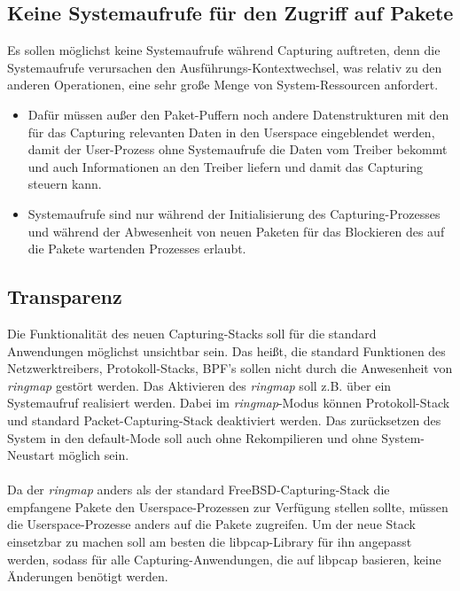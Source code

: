 \subsection{Keine Systemaufrufe für den Zugriff auf Pakete}
Es sollen möglichst keine Systemaufrufe während Capturing auftreten, denn die
Systemaufrufe verursachen den Ausführungs-Kontextwechsel, was relativ zu den
anderen Operationen, eine sehr große Menge von System-Ressourcen anfordert.
		\begin{itemize}
			\item Dafür müssen außer den Paket-Puffern noch andere
				Datenstrukturen mit den für das Capturing relevanten Daten in den
				Userspace eingeblendet werden, damit der User-Prozess ohne
				Systemaufrufe die Daten vom Treiber bekommt und auch
				Informationen an den Treiber liefern und damit das Capturing
				steuern kann.
			\item   Systemaufrufe sind nur während der Initialisierung des
				Capturing-Prozesses 
				und während der Abwesenheit von neuen
				Paketen für das Blockieren des auf die Pakete wartenden
				Prozesses erlaubt. 
		\end{itemize}

\subsection{Transparenz}
Die Funktionalität des neuen Capturing-Stacks soll für die standard Anwendungen
möglichst unsichtbar sein. Das heißt, die standard Funktionen des
Netzwerktreibers, Protokoll-Stacks, BPF's sollen nicht durch die Anwesenheit
von \emph{ringmap} gestört werden. Das Aktivieren des \emph{ringmap} soll z.B.
über ein Systemaufruf realisiert werden. Dabei im \emph{ringmap}-Modus können
Protokoll-Stack und standard Packet-Capturing-Stack deaktiviert werden. Das
zurücksetzen des System in den default-Mode soll auch ohne Rekompilieren und
ohne System-Neustart möglich sein.\\\\
%
Da der \emph{ringmap} anders als der standard FreeBSD-Capturing-Stack die
empfangene Pakete den Userspace-Prozessen zur Verfügung stellen sollte, müssen
die Userspace-Prozesse anders auf die Pakete zugreifen. Um der neue Stack
einsetzbar zu machen soll am besten die libpcap-Library für ihn angepasst
werden, sodass für alle Capturing-Anwendungen, die auf libpcap basieren, keine
Änderungen benötigt werden. 

